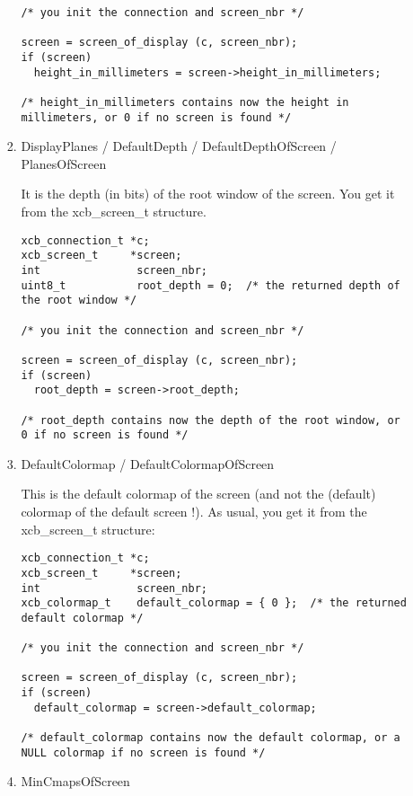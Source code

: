 \documentclass[12pt,oneside,titlepage]{book}
\begin{document}
\begin{enumerate}
\begin{enumerate}
\begin{enumerate}
\begin{verbatim}
/* you init the connection and screen_nbr */

screen = screen_of_display (c, screen_nbr);
if (screen)
  height_in_millimeters = screen->height_in_millimeters;

/* height_in_millimeters contains now the height in millimeters, or 0 if no screen is found */
\end{verbatim}
    \item
      \protect\hypertarget{DisplayPlanes}{}{DisplayPlanes / DefaultDepth
      / DefaultDepthOfScreen / PlanesOfScreen}

      It is the depth (in bits) of the root window of the screen. You
      get it from the {xcb\_screen\_t} structure.

\begin{verbatim}
xcb_connection_t *c;
xcb_screen_t     *screen;
int               screen_nbr;
uint8_t           root_depth = 0;  /* the returned depth of the root window */

/* you init the connection and screen_nbr */

screen = screen_of_display (c, screen_nbr);
if (screen)
  root_depth = screen->root_depth;

/* root_depth contains now the depth of the root window, or 0 if no screen is found */
\end{verbatim}
    \item
      \protect\hypertarget{DefaultColormap}{}{DefaultColormap /
      DefaultColormapOfScreen}

      This is the default colormap of the screen (and not the (default)
      colormap of the default screen !). As usual, you get it from the
      {xcb\_screen\_t} structure:

\begin{verbatim}
xcb_connection_t *c;
xcb_screen_t     *screen;
int               screen_nbr;
xcb_colormap_t    default_colormap = { 0 };  /* the returned default colormap */

/* you init the connection and screen_nbr */

screen = screen_of_display (c, screen_nbr);
if (screen)
  default_colormap = screen->default_colormap;

/* default_colormap contains now the default colormap, or a NULL colormap if no screen is found */
\end{verbatim}
    \item
      \protect\hypertarget{MinCmapsOfScreen}{}{}MinCmapsOfScreen


\end{enumerate}
\end{enumerate}
\end{enumerate}
\end{document}
